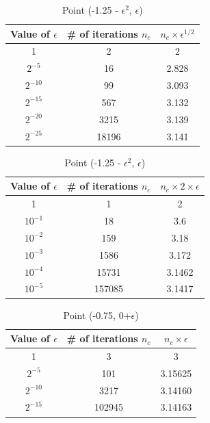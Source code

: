 \documentclass[a4paper]{article}
\begin{document}
\begin{table}[h]
\parbox{.4\linewidth}{
\centering
\begin{tabular}[h]{||c c c||} 
	    \hline
        Value of $\epsilon$ & \# of iterations $n_{c}$ & $n_{c} \times \epsilon^{1/2}$ \\ [0.5ex] 
        \hline\hline
        1 & 2 & 2 \\ 
        \hline
        $2^{-5}$ & 16 & 2.828 \\
        \hline
        $2^{-10}$ & 99 & 3.093  \\
        \hline
        $2^{-15}$ & 567 & 3.132  \\ 
        \hline
        $2^{-20}$ & 3215 & 3.139 \\
        \hline
        $2^{-25}$ & 18196 & 3.141 \\ [1ex] 
        \hline
\end{tabular}
\caption{Point (0.25+$\epsilon$, 0)}
}
\hspace{1.5cm}
\parbox{.4\linewidth}{
\begin{tabular}[h]{||c c c||} 
        \hline
        Value of $\epsilon$ & \# of iterations $n_{c}$ & $n_{c} \times 2 \times \epsilon$ \\ [0.5ex] 
        \hline\hline
        1 & 1 & 2 \\ 
        \hline
        $10^{-1}$ & 18 & 3.6  \\
        \hline
        $10^{-2}$ & 159 & 3.18  \\
        \hline
        $10^{-3}$ & 1586 & 3.172  \\ 
        \hline
        $10^{-4}$ & 15731 & 3.1462 \\
        \hline
        $10^{-5}$ & 157085 & 3.1417 \\ [1ex] 
        \hline
\end{tabular}
\caption{Point (-1.25 - $\epsilon^2$, $\epsilon$)}
}
\end{table}

\begin{table}[h]
\centering
\begin{tabular}[h]{||c c c||} 
        \hline
        Value of $\epsilon$ & \# of iterations $n_{c}$ & $n_{c} \times \epsilon$ \\ [0.5ex] 
        \hline\hline
        1 & 3 & 3 \\ 
        \hline
        $2^{-5}$ & 101 & 3.15625 \\
        \hline
        $2^{-10}$ & 3217 & 3.14160  \\
        \hline
        $2^{-15}$ & 102945 & 3.14163 \\ [1ex]
        \hline
\end{tabular}
\caption{Point (-0.75, 0+$\epsilon$)}
\end{table}
\end{document}
